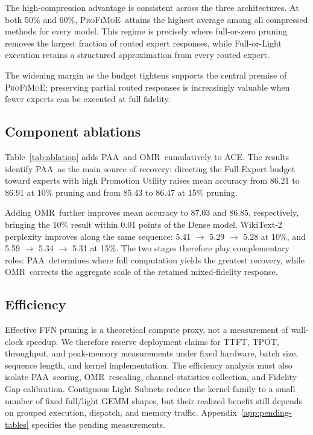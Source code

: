 \documentclass{article}
\newcommand{\PAA}{\textsc{PAA}}
\newcommand{\OMR}{\textsc{OMR}}
\newcommand{\method}{\textsc{ProFiMoE}}
\begin{document}
The high-compression advantage is consistent across the three architectures. At both 50\% and 60\%, \method\ attains the highest average among all compressed methods for every model. This regime is precisely where full-or-zero pruning removes the largest fraction of routed expert responses, while Full-or-Light execution retains a structured approximation from every routed expert.

The widening margin as the budget tightens supports the central premise of \method: preserving partial routed responses is increasingly valuable when fewer experts can be executed at full fidelity.

\subsection{Component ablations}



Table~\ref{tab:ablation} adds \PAA\ and \OMR\ cumulatively to ACE. The results identify \PAA\ as the main source of recovery: directing the Full-Expert budget toward experts with high Promotion Utility raises mean accuracy from 86.21 to 86.91 at 10\% pruning and from 85.43 to 86.47 at 15\% pruning.

Adding \OMR\ further improves mean accuracy to 87.03 and 86.85, respectively, bringing the 10\% result within 0.01 points of the Dense model. WikiText-2 perplexity improves along the same sequence: 5.41 $\rightarrow$ 5.29 $\rightarrow$ 5.28 at 10\%, and 5.59 $\rightarrow$ 5.34 $\rightarrow$ 5.31 at 15\%. The two stages therefore play complementary roles: \PAA\ determines where full computation yields the greatest recovery, while \OMR\ corrects the aggregate scale of the retained mixed-fidelity response.

\subsection{Efficiency}

Effective FFN pruning is a theoretical compute proxy, not a measurement of wall-clock speedup. We therefore reserve deployment claims for TTFT, TPOT, throughput, and peak-memory measurements under fixed hardware, batch size, sequence length, and kernel implementation. The efficiency analysis must also isolate \PAA\ scoring, \OMR\ rescaling, channel-statistics collection, and Fidelity Gap calibration. Contiguous Light Subnets reduce the kernel family to a small number of fixed full/light GEMM shapes, but their realized benefit still depends on grouped execution, dispatch, and memory traffic. Appendix~\ref{app:pending-tables} specifies the pending measurements.
\end{document}
